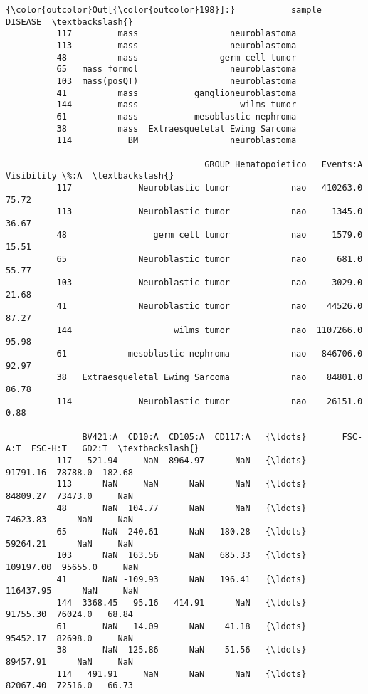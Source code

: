 \documentclass[11pt]{article}
\begin{document}
\begin{Verbatim}[commandchars=\\\{\}]
{\color{outcolor}Out[{\color{outcolor}198}]:}           sample                        DISEASE  \textbackslash{}
          117         mass                  neuroblastoma   
          113         mass                  neuroblastoma   
          48          mass                germ cell tumor   
          65   mass formol                  neuroblastoma   
          103  mass(posQT)                  neuroblastoma   
          41          mass           ganglioneuroblastoma   
          144         mass                    wilms tumor   
          61          mass           mesoblastic nephroma   
          38          mass  Extraesqueletal Ewing Sarcoma   
          114           BM                  neuroblastoma   
          
                                       GROUP Hematopoietico   Events:A  Visibility \%:A  \textbackslash{}
          117             Neuroblastic tumor            nao   410263.0           75.72   
          113             Neuroblastic tumor            nao     1345.0           36.67   
          48                 germ cell tumor            nao     1579.0           15.51   
          65              Neuroblastic tumor            nao      681.0           55.77   
          103             Neuroblastic tumor            nao     3029.0           21.68   
          41              Neuroblastic tumor            nao    44526.0           87.27   
          144                    wilms tumor            nao  1107266.0           95.98   
          61            mesoblastic nephroma            nao   846706.0           92.97   
          38   Extraesqueletal Ewing Sarcoma            nao    84801.0           86.78   
          114             Neuroblastic tumor            nao    26151.0            0.88   
          
               BV421:A  CD10:A  CD105:A  CD117:A   {\ldots}       FSC-A:T  FSC-H:T   GD2:T  \textbackslash{}
          117   521.94     NaN  8964.97      NaN   {\ldots}      91791.16  78788.0  182.68   
          113      NaN     NaN      NaN      NaN   {\ldots}      84809.27  73473.0     NaN   
          48       NaN  104.77      NaN      NaN   {\ldots}      74623.83      NaN     NaN   
          65       NaN  240.61      NaN   180.28   {\ldots}      59264.21      NaN     NaN   
          103      NaN  163.56      NaN   685.33   {\ldots}     109197.00  95655.0     NaN   
          41       NaN -109.93      NaN   196.41   {\ldots}     116437.95      NaN     NaN   
          144  3368.45   95.16   414.91      NaN   {\ldots}      91755.30  76024.0   68.84   
          61       NaN   14.09      NaN    41.18   {\ldots}      95452.17  82698.0     NaN   
          38       NaN  125.86      NaN    51.56   {\ldots}      89457.91      NaN     NaN   
          114   491.91     NaN      NaN      NaN   {\ldots}      82067.40  72516.0   66.73   
          

\end{Verbatim}
\end{document}
